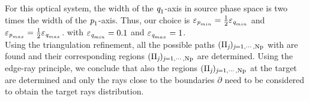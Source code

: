 For this optical system, the width of the $\textit{q}_1$-axis in source phase space is two times the width of the $\textit{p}_1$-axis.
Thus, our choice is $\varepsilon_{\textit{p}_{min}}=\frac{1}{2}\varepsilon_{\textit{q}_{min}}$ and $\varepsilon_{\textit{p}_{max}} = \frac{1}{2}\varepsilon_{\textit{q}_{max}}$.
with $\varepsilon_{\textit{q}_{min}}=0.1$ and $\varepsilon_{\textit{q}_{max}}=1$.
\\ \indent
Using the triangulation refinement, all the possible paths $(\Pi_{\textit{j}})_{\textit{j} = 1, \cdots, \textrm{Np}}$ with are found and their corresponding regions $(\Pi_{\textit{j}})_{\textit{j} = 1, \cdots, \textrm{Np}}$ are determined. Using the edge-ray principle, we conclude that also the regions $(\Pi_{\textit{j}})_{\textit{j} = 1, \cdots, \textrm{Np}}$ at the target are determined and only the rays close to the boundaries
$\partial$ need to be considered to obtain the target rays distribution.
